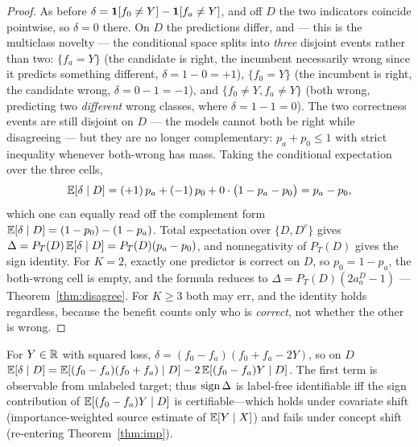 \begin{proof}
As before $\delta=\mathbf{1}[f_0\neq Y]-\mathbf{1}[f_a\neq Y]$, and off $D$ the two indicators
coincide pointwise, so $\delta=0$ there. On $D$ the predictions differ, and --- this is
the multiclass novelty --- the conditional space splits into \emph{three} disjoint
events rather than two: $\{f_a=Y\}$ (the candidate is right, the incumbent necessarily
wrong since it predicts something different, $\delta=1-0=+1$), $\{f_0=Y\}$ (the
incumbent is right, the candidate wrong, $\delta=0-1=-1$), and $\{f_0\neq Y, f_a\neq
Y\}$ (both wrong, predicting two \emph{different} wrong classes, where
$\delta=1-1=0$). The two correctness events are still disjoint on $D$ --- the models
cannot both be right while disagreeing --- but they are no longer complementary:
$p_a+p_0\le1$ with strict inequality whenever both-wrong has mass. Taking the
conditional expectation over the three cells,
\[
\mathbb{E}[\delta\mid D]
=(+1)\,p_a+(-1)\,p_0+0\cdot\bigl(1-p_a-p_0\bigr)
=p_a-p_0 ,
\]
which one can equally read off the complement form
$\mathbb{E}[\delta\mid D]=(1-p_0)-(1-p_a)$. Total expectation over $\{D,D^c\}$ gives
$\Delta=P_T(D)\,\mathbb{E}[\delta\mid D]=P_T(D)(p_a-p_0)$, and nonnegativity of $P_T(D)$ gives
the sign identity. For $K=2$, exactly one predictor is correct on $D$, so
$p_0=1-p_a$, the both-wrong cell is empty, and the formula reduces to
$\Delta=P_T(D)(2a_a^D-1)$ --- Theorem~\ref{thm:disagree}. For $K\ge3$ both may err,
and the identity holds regardless, because the benefit counts only who is
\emph{correct}, not whether the other is wrong. \qedhere
\end{proof}

\begin{theorem}
\label{thm:disagree-reg}
For $Y\in\mathbb{R}$ with squared loss, $\delta=(f_0-f_a)(f_0+f_a-2Y)$, so on $D$
$\mathbb{E}[\delta\mid D]=\mathbb{E}[(f_0-f_a)(f_0+f_a)\mid D]-2\,\mathbb{E}[(f_0-f_a)Y\mid D]$. The first term is
observable from unlabeled target; thus $\operatorname{sign}\Delta$ is label-free identifiable iff the
sign contribution of $\mathbb{E}[(f_0-f_a)Y\mid D]$ is certifiable---which holds under covariate
shift (importance-weighted source estimate of $\mathbb{E}[Y\mid X]$) and fails under concept
shift (re-entering Theorem~\ref{thm:imp}).
\end{theorem}

